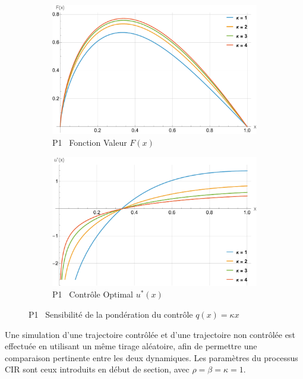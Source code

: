 \FloatBarrier\begin{figure}[htb]
    \centering
    \begin{subfigure}{0.45\linewidth}
        \includegraphics[width=\linewidth]{img/validation/P1/p1_K_value.pdf}
        \caption{P1 \textemdash~Fonction Valeur $F(x)$}\label{fig:KappaValueVisualisation1}
    \end{subfigure}
    \hfill
    \begin{subfigure}{0.45\linewidth}
        \includegraphics[width=\linewidth]{img/validation/P1/p1_K_control.pdf}
        \caption{P1 \textemdash~Contrôle Optimal $u^*(x)$}\label{fig:KappaControlVisualisation1}
    \end{subfigure}
    \caption{P1 \textemdash~Sensibilité de la pondération du contrôle $q(x)=\kappa x$}\label{fig:KappaValueControlComparison1}
\end{figure}
\FloatBarrier Une simulation d'une trajectoire contrôlée et d'une trajectoire non contrôlée est effectuée en utilisant un même tirage aléatoire, afin de permettre une comparaison pertinente entre les deux dynamiques. Les paramètres du processus \acs{CIR} sont ceux introduits en début de section, avec $\rho = \beta = \kappa = 1$.
